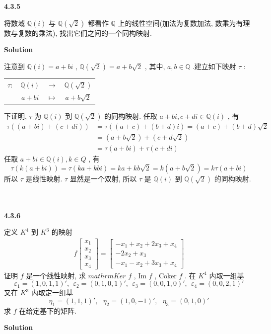 \documentclass[11pt,a4paper,openany,oneside]{book}
\newcommand\Solution{\noindent\textbf{\textsf{Solution}}\par\medskip}
\begin{document}
\begin{myexample}
\textbf{4.3.5} 

将数域 $ \mathbb{Q}(i) $ 与 $ \mathbb{Q}(\sqrt{2}) $ 都看作 $ \mathbb{Q} $ 上的线性空间(加法为复数加法, 数乘为有理数与复数的乘法), 找出它们之间的一个同构映射. \\  

\end{myexample}
\Solution 

注意到 $ \mathbb{Q}(i) = a + bi $ ,  $ \mathbb{Q}(\sqrt{2}) = a + b\sqrt{2} $ , 其中, $ a, b \in \mathbb{Q} $ .建立如下映射 $ \tau $ :
\begin{center}
	\begin{tabular}{cccc}
		 $ \tau :  $  &  $ \mathbb{Q}(i) $   &    $ \longrightarrow $   &   $ \mathbb{Q}(\sqrt{2}) $   \\
		&  $ a + bi $          &    $ \longmapsto $   &   $ a+b\sqrt{2} $  
	\end{tabular}
\end{center}
下证明,  $ \tau $ 为 $ \mathbb{Q}(i) $ 到 $ \mathbb{Q}(\sqrt{2}) $ 的同构映射. 任取 $ a+bi, c+di \in \mathbb{Q}(i) $ , 有
\begin{align*}
\tau ((a+bi) + (c+di)) &= \tau((a+c)+(b+d)i) = (a+c) + (b+d)\sqrt{2} \\
&= (a+b\sqrt{2}) + (c + d\sqrt{2}) \\
&= \tau(a+bi) + \tau(c+di)
\end{align*}
任取 $ a+bi \in \mathbb{Q}(i), k \in Q $ , 有
 $$  \tau(k(a+bi)) = \tau(ka+kbi) = ka + kb\sqrt{2} = k(a+b\sqrt{2}) = k\tau(a+bi)  $$ 
所以 $ \tau $ 是线性映射.  $ \tau $ 显然是一个双射, 所以 $ \tau $ 是 $ \mathbb{Q}(i) $ 到 $ \mathbb{Q}(\sqrt{2}) $ 的同构映射. \\  \\  \\ 





\begin{myexample}
	\textbf{4.3.6} 

定义 $ K^4 $ 到 $ K^3 $ 的映射
\begin{gather*}
f
\begin{bmatrix}
x_1 \\ x_2 \\ x_3 \\ x_4
\end{bmatrix}
=
\begin{bmatrix}
-x_1 + x_2 + 2x_3 + x_4 \\ 
-2x_2 + x_3 \\
-x_1 -x_2 + 3x_3 + x_4
\end{bmatrix}
\end{gather*}
证明 $ f $ 是一个线性映射, 求 $mathrm{Ker}$  $ f $ , Im $ f $ , Coker $ f $ . 在 $ K^4 $ 内取一组基
 $$  \varepsilon_1 = (1,0,1,1)', \ \ \varepsilon_2=(0,1,0,1)', \ \ \varepsilon_3=(0,0,1,0)', \ \ \varepsilon_4=(0,0,2,1)'  $$ 
又在 $ K^3 $ 内取定一组基
 $$  \eta_1 = (1,1,1)', \ \ \ \eta_2 = (1, 0, -1)', \ \ \ \eta_3=(0,1,0)'  $$ 
求 $ f $ 在给定基下的矩阵. \\ 

\end{myexample}
\Solution 
\end{document}
